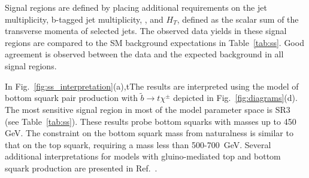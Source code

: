 Signal regions are defined by placing additional requirements on the jet multiplicity, b-tagged jet multiplicity, 
\met, and $H_T$, defined as the scalar sum of the transverse momenta of selected jets. The observed data yields 
in these signal regions are compared to the SM background expectations in 
Table~\ref{tab:ss}. Good agreement is observed between the data and the expected background in all signal regions.

In Fig.~\ref{fig:ss_interpretation}(a),tThe results are interpreted using the model of bottom squark pair 
production with $\tilde{b}\to t \chi^{\pm}$ depicted in Fig.~\ref{fig:diagrams}(d).
The most sensitive signal region in most of the model parameter space is SR3 (see Table~\ref{tab:ss}).
These results probe bottom squarks with masses up to 450 GeV.
The constraint on the bottom squark mass from naturalness is similar to that on the top squark, requiring 
a mass less than 500-700~GeV. Several additional interpretations for models with gluino-mediated top and 
bottom squark production are presented in Ref.~\cite{ref:ss}.





